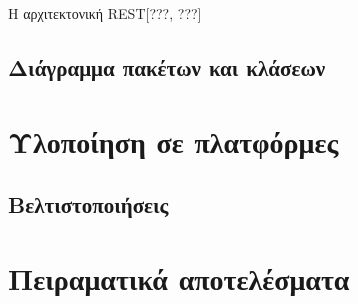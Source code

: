 Η αρχιτεκτονική REST[???, ???]



\subsection{Διάγραμμα πακέτων και κλάσεων}



\section{Υλοποίηση σε πλατφόρμες}

\subsection{Βελτιστοποιήσεις}

\section{Πειραματικά αποτελέσματα}